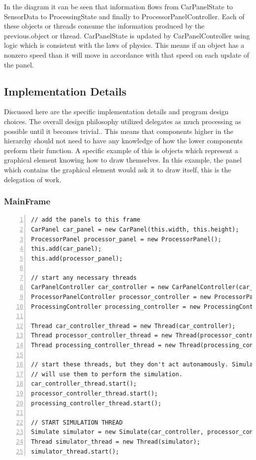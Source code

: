 \documentclass{article} %
\begin{document}
In the diagram it can be seen that information flows from CarPanelState to SensorData to ProcessingState and finally to ProcessorPanelController.
Each of these objects or threads consume the information produced by the previous.object or thread.
CarPanelState is updated by CarPanelController using logic which is consistent with the laws of physics.
This means if an object has a nonzero speed than it will move in accordance with that speed on each update of the panel.

\subsection{Implementation Details}
Discussed here are the specific implementation details and program design choices.
The overall design philosophy utilized delegates as much processing as possible until it becomes trivial..
This means that components higher in the hierarchy should not need to have any knowledge of how the lower components preform their function.
A specific example of this is objects which represent a graphical element knowing how to draw themselves. In this example, the panel which contains the graphical element would ask it to draw itself, this is the delegation of work. 

\subsubsection{MainFrame}
\begin{lstlisting}[float=*,caption={Setup Threads},label={lst:threads},numbers=left]
// add the panels to this frame
CarPanel car_panel = new CarPanel(this.width, this.height);
ProcessorPanel processor_panel = new ProcessorPanel();
this.add(car_panel);
this.add(processor_panel);

// start any necessary threads
CarPanelController car_controller = new CarPanelController(car_panel);
ProcessorPanelController processor_controller = new ProcessorPanelController(processor_panel);
ProcessingController processing_controller = new ProcessingController(scheduling_algorithm, n_processors);

Thread car_controller_thread = new Thread(car_controller);
Thread processor_controller_thread = new Thread(processor_controller);
Thread processing_controller_thread = new Thread(processing_controller);
    
// start these threads, but they don't act autonamously. Simulate thread
// will use them to perform the simulation.
car_controller_thread.start();
processor_controller_thread.start();
processing_controller_thread.start();

// START SIMULATION THREAD
Simulate simulator = new Simulate(car_controller, processor_controller, processing_controller, width, height);
Thread simulator_thread = new Thread(simulator);
simulator_thread.start();
\end{lstlisting}
\end{document}
